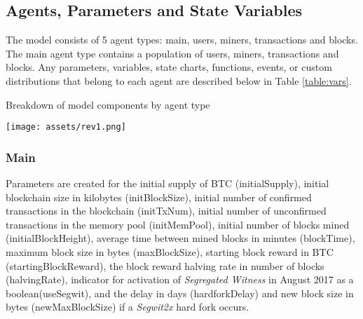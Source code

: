 \documentclass[12pt]{report}
\begin{document}
\subsection{Agents, Parameters and State Variables}
The model consists of 5 agent types: main, users, miners, transactions and blocks. The main agent type contains a population of users, miners, transactions and blocks. Any parameters, variables, state charts, functions, events, or custom distributions that belong to each agent are described below in Table \ref{table:vars}. %

\begin{table}[h!]
\caption{Breakdown of model components by agent type}
\texttt{[image: assets/rev1.png]}
\label{table:vars}
\end{table}

\begin{comment}
\begin{center}
 \begin{tabular}{||c| c| c| c| c| c||}
 \hline
  & Main & Users & Miners & Transactions & Blocks \\ [0.5ex] 
 \hline\hline
 Parameters & initialSupply initBlockSize initTxNum & 6 & 87837 & 787 & x \\ 
 \hline
 Variables & 2 & 7 & 78 & 5415 & x \\
 \hline
 Functions & 3 & 545 & 778 & 7507 & x \\
 \hline
 Events & 4 & 545 & 18744 & 7560 & x \\
 \hline
 State Charts & 5 & 88 & 788 & 6344 & x \\ [1ex] 
 \hline
\end{tabular}
\end{center}
\end{comment}

\subsubsection{Main}
Parameters are created for the initial supply of BTC (initialSupply), initial blockchain size in kilobytes (initBlockSize), initial number of confirmed transactions in the blockchain (initTxNum), initial number of unconfirmed transactions in the memory pool (initMemPool), initial number of blocks mined (initialBlockHeight), average time between mined blocks in minutes (blockTime), maximum block size in bytes (maxBlockSize), starting block reward in BTC (startingBlockReward), the block reward halving rate in number of blocks (halvingRate), indicator for activation of \textit{Segregated Witness} in August 2017 as a boolean(useSegwit), and the delay in days (hardforkDelay) and new block size in bytes (newMaxBlockSize) if a \textit{Segwit2x} hard fork occurs.
\end{document}

